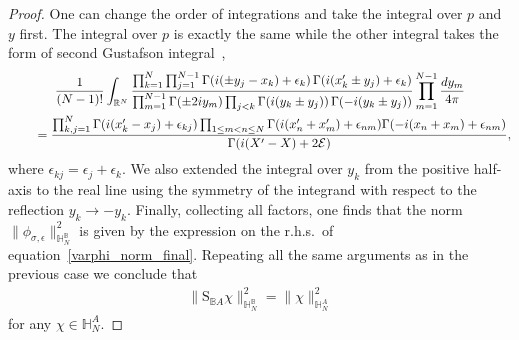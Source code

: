 \documentclass[11pt]{article}
\numberwithin{equation}{section}
\numberwithin{equation}{section}
\begin{document}
\begin{proof}
One can change the order of integrations and take the integral over $p$ and $y$ first. The integral over $p$ is exactly the same while the
other integral takes the form of second Gustafson integral~\cite[Theorem 9.3]{MR1139492},
\begin{gather*}
\frac1{(N-1)!}\int_{\mathbb R^N}\frac{\prod_{k=1}^N\prod_{j=1}^{N-1} \Gamma({\rm i}(\pm y_j- x_k)+\epsilon_k)\,\Gamma({\rm i}( x'_k\pm y_j)+\epsilon_k)}
{\prod_{m=1}^{N-1}\Gamma(\pm 2{\rm i} y_m) \prod_{j < k}\Gamma({\rm i}(y_k \pm y_j))\,\Gamma(-{\rm i}(y_k\pm y_j))}
\prod_{m=1}^{N-1} \frac{{\rm d}y_m}{4\pi}
\\ \qquad
{}=\frac{\prod_{k,j=1}^{N} \Gamma({\rm i}(x'_k-x_j)+\epsilon_{kj})\prod_{1\leq m<n\leq N}
\Gamma({\rm i}(x'_n+x'_m)+\epsilon_{nm}) \Gamma(-{\rm i}(x_n+x_m)+\epsilon_{nm})
 }{\Gamma({\rm i}(X'-X)+2\mathcal E)},
\end{gather*}
where $\epsilon_{kj}=\epsilon_j+\epsilon_k$.
We also extended the integral over $y_k$ from the positive half-axis to the real line using
the symmetry of the integrand with respect to the reflection $y_k\to -y_k$. Finally, collecting all factors, one finds that the norm
$\|\phi_{\sigma,\epsilon}\|^2_{\mathbb H_N^{\mathbb B}}$ is given by the expression on the r.h.s.\ of equation~\eqref{varphi_norm_final}.
Repeating all the same arguments as in the previous case we conclude that{\samepage
\begin{gather*}
\|\mathrm S_{\mathbb B A}\chi\|^2_{\mathbb H_N^{\mathbb B}}=\|\chi\|^2_{\mathbb H_{N}^A}
\end{gather*}
for any $\chi\in\mathbb H_{N}^A$.}



\end{proof}
\end{document}
